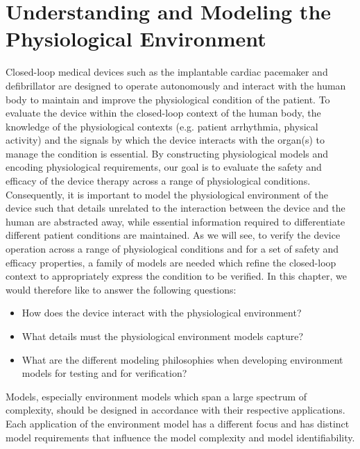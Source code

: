 \chapter{Understanding and Modeling the Physiological Environment}

Closed-loop medical devices such as the implantable cardiac pacemaker and defibrillator are designed to operate autonomously and interact with the human body to maintain and improve the physiological condition of the patient. To evaluate the device within the closed-loop context of the human body, the knowledge of the physiological contexts (e.g. patient arrhythmia, physical activity) and the signals by which the device interacts with the organ(s) to manage the condition is essential. By constructing physiological models and encoding physiological requirements, our goal is to evaluate the safety and efficacy of the device therapy across a range of physiological conditions. Consequently, it is important to model the physiological environment of the device such that details unrelated to the interaction between the device and the human are abstracted away, while essential information required to differentiate different patient conditions are maintained. As we will see, to verify the device operation across a range of physiological conditions and for a set of safety and efficacy properties, a family of models are needed which refine the closed-loop context to appropriately express the condition to be verified. In this chapter, we would therefore like to answer the following questions:

\begin{itemize}
\vspace{-5pt}
\item How does the device interact with the physiological environment?
\vspace{-5pt}
\item What details must the physiological environment models capture?
\vspace{-5pt}
\item What are the different modeling philosophies when developing environment models for testing and for verification?
\end{itemize}

Models, especially environment models which span a large spectrum of complexity, should be designed in accordance with their respective applications. Each application of the environment model has a different focus and has distinct model requirements that influence the model complexity and model identifiability.

